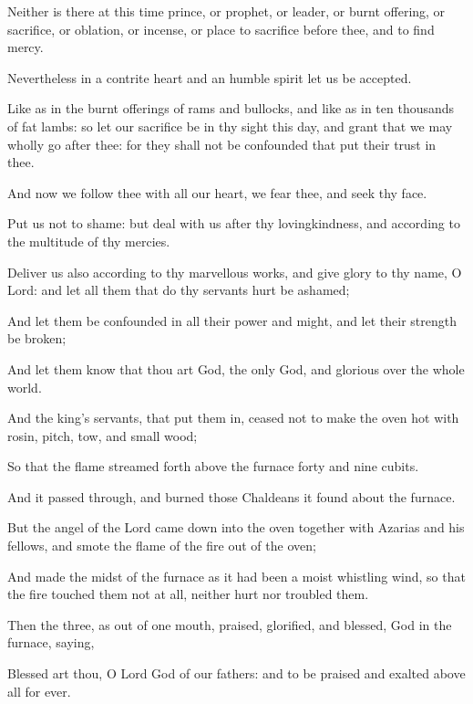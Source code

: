 {\par }{\PP {}Neither is there at this time prince, or prophet, or leader, or burnt offering, or sacrifice, or oblation, or incense, or place to sacrifice before thee, and to find mercy.
\par }{\PP {}Nevertheless in a contrite heart and an humble spirit let us be accepted.
\par }{\PP {}Like as in the burnt offerings of rams and bullocks, and like as in ten thousands of fat lambs: so let our sacrifice be in thy sight this day, and grant that we may wholly go after thee: for they shall not be confounded that put their trust in thee.
\par }{\PP {}And now we follow thee with all our heart, we fear thee, and seek thy face.
\par }{\PP {}Put us not to shame: but deal with us after thy lovingkindness, and according to the multitude of thy mercies.
\par }{\PP {}Deliver us also according to thy marvellous works, and give glory to thy name, O Lord: and let all them that do thy servants hurt be ashamed;
\par }{\PP {}And let them be confounded in all their power and might, and let their strength be broken;
\par }{\PP {}And let them know that thou art God, the only God, and glorious over the whole world.
\par }{\PP {}And the king’s servants, that put them in, ceased not to make the oven hot with rosin, pitch, tow, and small wood;
\par }{\PP {}So that the flame streamed forth above the furnace forty and nine cubits.
\par }{\PP {}And it passed through, and burned those Chaldeans it found about the furnace.
\par }{\PP {}But the angel of the Lord came down into the oven together with Azarias and his fellows, and smote the flame of the fire out of the oven;
\par }{\PP {}And made the midst of the furnace as it had been a moist whistling wind, so that the fire touched them not at all, neither hurt nor troubled them.
\par }{\PP {}Then the three, as out of one mouth, praised, glorified, and blessed, God in the furnace, saying,
\par }{\PP {}Blessed art thou, O Lord God of our fathers: and to be praised and exalted above all for ever.
}
